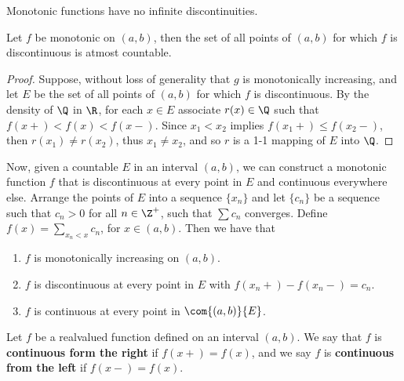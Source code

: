 \begin{corollary}
    Monotonic functions have no infinite discontinuities.
\end{corollary}

\begin{theorem}\label{5.6.2}
    Let $f$ be monotonic on  $(a,b)$, then the set of all  points of $(a,b)$ for which
    $f$ is  discontinuous is atmost countable.
\end{theorem}
\begin{proof}
    Suppose, without loss of generality that $g$ is monotonically increasing, and let  $E$
    be the set of all points of  $(a,b)$ for which  $f$ is discontinuous. By the density of
    $\Q$ in  $\R$, for each $x \in E$ associate $r(x) \in \Q$ such that $f(x+)<f(x)<f(x-)$.
    Since  $x_1 < x_2$ implies $f(x_1+) \leq f(x_2-)$, then $r(x_1) \neq r(x_2)$, thus
    $x_1 \neq x_2$, and so $r$ is a 1-1 mapping of  $E$ into  $\Q$.
\end{proof}

Now, given a countable $E$ in an interval  $(a,b)$, we can construct a monotonic function $f$ that
is discontinuous at every point in  $E$ and continuous everywhere else. Arrange  the points of
$E$ into a sequence  $\{x_n\}$ and let  $\{c_n\}$ be a sequence such that  $c_n>0$ for
all  $n \in \Z^+$, such that  $\sum{c_n}$ converges. Define  $f(x)=\sum_{x_n<x}{c_n}$, for
$x \in (a,b)$. Then we have that
    \begin{enumerate}[label=(\arabic*)]
        \item $f$ is monotonically increasing on $(a,b)$.

        \item $f$ is discontinuous at every point in $E$ with $f(x_n+)-f(x_n-)=c_n$.

        \item $f$ is continuous at every point in $\com{(a,b)}{E}$.
    \end{enumerate}

\begin{definition}
    Let $f$ be a realvalued function defined on an interval $(a,b)$. We say that $f$ is
    \textbf{continuous form the right} if $f(x+)=f(x)$, and we say $f$ is
    \textbf{continuous from the left} if $f(x-)=f(x)$.
\end{definition}
